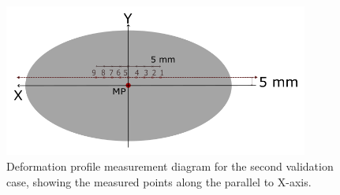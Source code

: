 \begin{figure}%
	\centering
   \quad
   \includegraphics[width=10cm]{Images/validationcase/defprof/defprofdiag.png}%
   \caption[Deformation profile - Diagram]{Deformation profile measurement diagram for the second validation case, showing the measured points along the parallel to X-axis.}%
   \label{fig:defprofdiagram}%
\end{figure}

